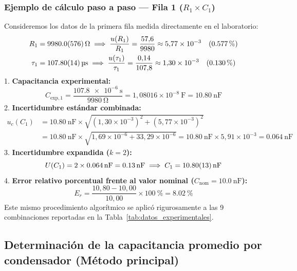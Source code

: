 \subsubsection{Ejemplo de cálculo paso a paso --- Fila 1 (\texorpdfstring{$R_1 \times C_1$}{R1 x C1})}
Consideremos los datos de la primera fila medida directamente en el laboratorio:
\begin{align*}
    R_1 &= \qty{9980,0 \pm 57,6}{\ohm} \implies \frac{u(R_1)}{R_1} = \frac{57{,}6}{9980} \approx 5{,}77 \times 10^{-3} \quad (\qty{0,577}{\percent}) \\
    \tau_1 &= \qty{107,8 \pm 0,14}{\micro\second} \implies \frac{u(\tau_1)}{\tau_1} = \frac{0{,}14}{107{,}8} \approx 1{,}30 \times 10^{-3} \quad (\qty{0,130}{\percent})
\end{align*}
1. \textbf{Capacitancia experimental:}
\begin{equation*}
    C_{\text{exp},1} = \frac{\qty{107,8e-6}{\second}}{\qty{9980}{\ohm}} = 1{,}08016 \times 10^{-8}\ \unit{\farad} = \qty{10,80}{\nano\farad}
\end{equation*}
2. \textbf{Incertidumbre estándar combinada:}
\begin{align*}
    u_c(C_1) &= \qty{10,80}{\nano\farad} \times \sqrt{(1{,}30 \times 10^{-3})^2 + (5{,}77 \times 10^{-3})^2} \\
    &= \qty{10,80}{\nano\farad} \times \sqrt{1{,}69 \times 10^{-6} + 33{,}29 \times 10^{-6}} = \qty{10,80}{\nano\farad} \times 5{,}91 \times 10^{-3} = \qty{0,064}{\nano\farad}
\end{align*}
3. \textbf{Incertidumbre expandida ($k=2$):}
\begin{equation*}
    U(C_1) = 2 \times \qty{0,064}{\nano\farad} = \qty{0,13}{\nano\farad} \implies C_1 = \qty{10,80 \pm 0,13}{\nano\farad}
\end{equation*}
4. \textbf{Error relativo porcentual frente al valor nominal ($C_{\text{nom}} = \qty{10,0}{\nano\farad}$):}
\begin{equation*}
    E_r = \frac{10{,}80 - 10{,}00}{10{,}00} \times \qty{100}{\percent} = \qty{+8,02}{\percent}
\end{equation*}
Este mismo procedimiento algorítmico se aplicó rigurosamente a las 9 combinaciones reportadas en la Tabla~\ref{tab:datos_experimentales}.

\subsection{Determinación de la capacitancia promedio por condensador (Método principal)}

